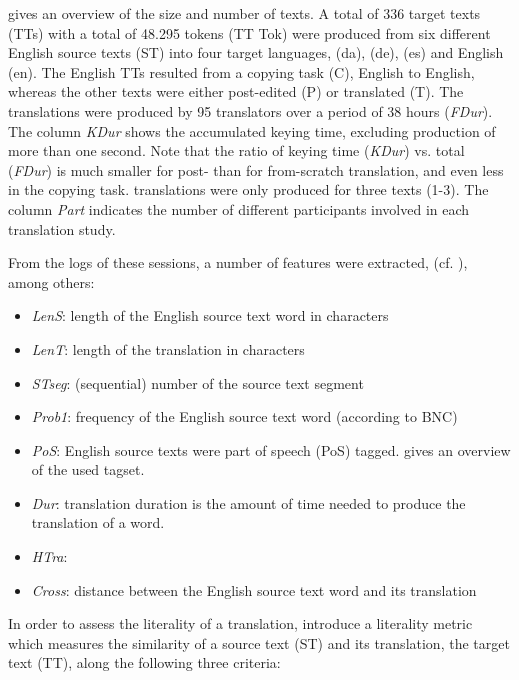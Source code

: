 \documentclass[output=paper]{LSP/langsci}
\begin{document}
\largerpage[-1]
 gives an overview of the size and number of texts. A total of 336 target texts (TTs) with a total of 48.295  tokens (TT Tok) were produced from six different English source texts (ST) into four target languages,  (da),  (de),  (es) and English (en). The English TTs resulted from a copying task (C), English to English, whereas the other texts were either post-edited (P) or translated (T). The translations were produced by 95 translators over a period of 38 hours (\textit{FDur}). The column \textit{KDur} shows the accumulated keying time, excluding production  of more than one second. Note that the ratio of keying time (\textit{KDur}) vs. total  (\textit{FDur}) is much smaller for post- than for from-scratch translation, and even less in the copying task.  translations were only produced for three texts (1-3). The column \textit{Part} indicates the number of different participants involved in each translation study. 

 
\largerpage[-1]
From the logs of these sessions, a number of features were extracted, (cf. \citealt{Carl2016CRITT}), among others:
\begin{itemize}
\item \textit{LenS}: length of the English source text word in characters
\item \textit{LenT}: length of the translation in characters
\item \textit{STseg}: (sequential) number of the source text segment
\item \textit{Prob1}: frequency of the English source text word (according to BNC) 
\item \textit{PoS}: English source texts were part of speech (PoS) tagged.  gives an overview of the used tagset.
\item \textit{Dur}: translation duration is the amount of time needed to produce the translation of a word. 
\item \textit{HTra}:  
\item \textit{Cross}: distance between the English source text word and its translation 
\end{itemize}

In order to assess the literality of a translation, \citet{Carl2016CRITT,Carl2016Literality} introduce a literality metric which measures the similarity of a source text (ST) and its translation, the target text (TT), along the following three criteria:
\end{document}
